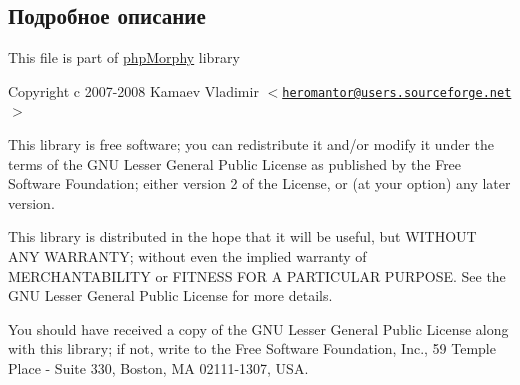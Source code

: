 \subsection{Подробное описание}
This file is part of \hyperlink{classphpMorphy}{phpMorphy} library

Copyright c 2007-\/2008 Kamaev Vladimir $<$\href{mailto:heromantor@users.sourceforge.net}{\tt heromantor@users.sourceforge.net}$>$

This library is free software; you can redistribute it and/or modify it under the terms of the GNU Lesser General Public License as published by the Free Software Foundation; either version 2 of the License, or (at your option) any later version.

This library is distributed in the hope that it will be useful, but WITHOUT ANY WARRANTY; without even the implied warranty of MERCHANTABILITY or FITNESS FOR A PARTICULAR PURPOSE. See the GNU Lesser General Public License for more details.

You should have received a copy of the GNU Lesser General Public License along with this library; if not, write to the Free Software Foundation, Inc., 59 Temple Place -\/ Suite 330, Boston, MA 02111-\/1307, USA. 

